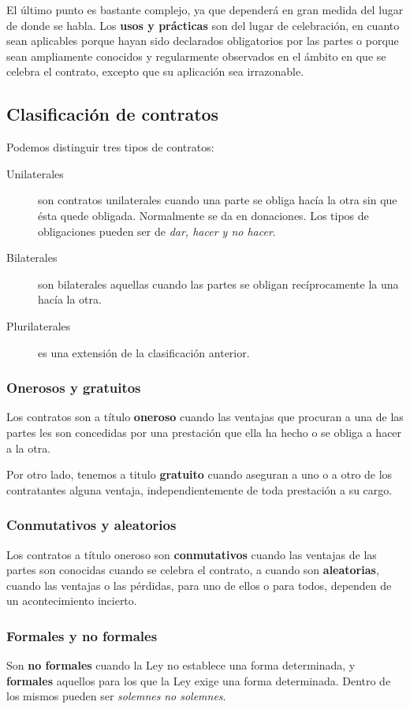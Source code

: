 \documentclass[../main.tex]{subfiles}
\begin{document}
El último punto es bastante complejo, ya que dependerá en gran medida del lugar
de donde se habla. Los \textbf{usos y prácticas} son del lugar de celebración, en 
cuanto sean aplicables porque hayan sido declarados obligatorios por las partes
o porque sean ampliamente conocidos y regularmente observados en el ámbito en 
que se celebra el contrato, excepto que su aplicación sea irrazonable.

\subsection{Clasificación de contratos}

Podemos distinguir tres tipos de contratos:

\begin{description}
  \item[Unilaterales] son contratos unilaterales cuando una parte se obliga hacía
    la otra sin que ésta quede obligada. Normalmente se da en donaciones. Los 
    tipos de obligaciones pueden ser de \textit{dar, hacer y no hacer}.
  \item[Bilaterales] son bilaterales aquellas cuando las partes se obligan
    recíprocamente la una hacía la otra.
  \item[Plurilaterales] es una extensión de la clasificación anterior. 
\end{description}

\subsubsection{Onerosos y gratuitos}

Los contratos son a título \textbf{oneroso} cuando las ventajas que procuran
a una de las partes les son concedidas por una prestación que ella ha hecho
o se obliga a hacer a la otra.

Por otro lado, tenemos a titulo \textbf{gratuito} cuando aseguran a uno o a otro
de los contratantes alguna ventaja, independientemente de toda prestación a su
cargo.

\subsubsection{Conmutativos y aleatorios}

Los contratos a título oneroso son \textbf{conmutativos} cuando las ventajas
de las partes son conocidas cuando se celebra el contrato, a cuando son 
\textbf{aleatorias}, cuando las ventajas o las pérdidas, para uno de ellos o
para todos, dependen de un acontecimiento incierto.

\subsubsection{Formales y no formales}

Son \textbf{no formales} cuando la Ley no establece una forma determinada, y 
\textbf{formales} aquellos para los que la Ley exige una forma determinada. Dentro
de los mismos pueden ser \textit{solemnes} \textit{no solemnes}. 
\end{document}
